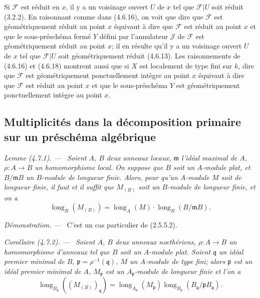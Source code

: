 \documentclass[10pt,oneside]{book}
\newcommand{\oldpage}[2][]{%
  \setcounter{footnote}{0}%
  \marginpar{\scriptsize\textbf{#1}~|~#2}\ignorespaces}
\newenvironment{corollary}[1][]{%
  \par\medskip\noindent\itshape Corollaire (#1). ---\ }{\par}
\newenvironment{lemma}[1][]{%
  \par\medskip\noindent\itshape Lemme (#1). ---\ }{\par}
\newenvironment{proof}{%
  \par\medskip\noindent\textit{Démonstration. ---\ }}{\par}
\begin{document}
\oldpage[IV-2]{75}

Si $\mathscr F$ est réduit en $x$, il y a un voisinage ouvert $U$ de $x$ tel
que $\mathscr F|U$ soit réduit (3.2.2). En raisonnant comme dans (4.6.16), on
voit que dire que $\mathscr F$ est géométriquement réduit au point $x$
équivaut à dire que $\mathscr F$ est réduit au point $x$ et que le
sous-préschéma fermé $Y$ défini par l'annulateur $\mathscr J$ de $\mathscr F$
est géométriquement réduit au point $x$; il en résulte qu'il y a un voisinage
ouvert $U$ de $x$ tel que $\mathscr F|U$ soit géométriquement réduit (4.6.13).
Les raisonnements de (4.6.16) et (4.6.18) montrent aussi que si $X$ est
localement de type fini sur $k$, dire que $\mathscr F$ est géométriquement
ponctuellement intègre au point $x$ équivaut à dire que $\mathscr F$ est
réduit au point $x$ et que le sous-préschéma $Y$ est géométriquement
ponctuellement intègre au point $x$.

\subsection{Multiplicités dans la décomposition primaire sur un préschéma
algébrique}
\label{subsection:IV.4.7-fr}

\begin{lemma}[4.7.1]
\label{IV.2.4.7.1-fr}
Soient $A$, $B$ deux anneaux locaux, $\mathfrak m$ l'idéal maximal de $A$,
$\rho:A\to B$ un homomorphisme local. On suppose que $B$ soit un $A$-module
plat, et $B/\mathfrak mB$ un $B$-module de longueur finie. Alors, pour qu'un
$A$-module $M$ soit de longueur finie, il faut et il suffit que $M_{(B)}$ soit
un $B$-module de longueur finie, et on a
\begin{equation}
\operatorname{long}_B(M_{(B)})
=\operatorname{long}_A(M)\cdot\operatorname{long}_B(B/\mathfrak mB).
\tag{4.7.1.1}
\label{IV.2.4.7.1.1-fr}
\end{equation}
\end{lemma}

\begin{proof}
C'est un cas particulier de (2.5.5.2).
\end{proof}


\begin{corollary}[4.7.2]
\label{IV.2.4.7.2-fr}
Soient $A$, $B$ deux anneaux noethériens, $\rho:A\to B$ un homomorphisme
d'anneaux tel que $B$ soit un $A$-module plat. Soient $\mathfrak q$ un idéal
premier minimal de $B$, $\mathfrak p=\rho^{-1}(\mathfrak q)$, $M$ un
$A$-module de type fini; alors $\mathfrak p$ est un idéal premier minimal de
$A$, $M_{\mathfrak p}$ est un $A_{\mathfrak p}$-module de longueur finie et
l'on a
\begin{equation}
\operatorname{long}_{B_{\mathfrak q}}((M_{(B)})_{\mathfrak q})
=\operatorname{long}_{A_{\mathfrak p}}(M_{\mathfrak p})
 \operatorname{long}_{B_{\mathfrak q}}
 (B_{\mathfrak q}/\mathfrak pB_{\mathfrak q}).
\tag{4.7.2.1}
\label{IV.2.4.7.2.1-fr}
\end{equation}
\end{corollary}
\end{document}
